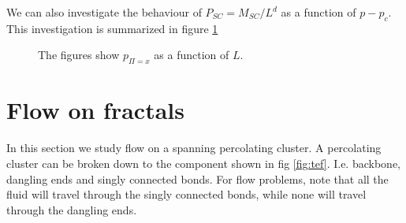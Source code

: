 \documentclass[12pt]{article}
\begin{document}
We can also investigate the behaviour of $P_{SC} = M_{SC}/L^d$ as a function of $p-p_c$. This investigation is summarized in figure \ref{fig:12}

\begin{figure}[ht]
\caption[Optional caption for list of figures]{The figures show $p_{\Pi=x}$ as a function of $L$.}
\label{fig:12}
\end{figure}

\clearpage

\section{Flow on fractals}
In this section we study flow on a spanning percolating cluster. A percolating cluster can be broken down to the component shown in fig \ref{fig:tef}. I.e. backbone, dangling ends and singly connected bonds. For flow problems, note that all the fluid will travel through the singly connected bonds, while none will travel through the dangling ends.
\end{document}

